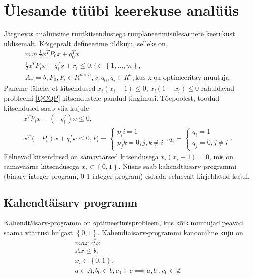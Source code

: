 \documentclass[a4paper]{article}
\numberwithin{equation}{section}
\theoremstyle{definition}
\begin{document}
\section{Ülesande t\"u\"ubi keerekuse anal\"u\"us}
Järgnevas anal\"u\"usime ruutkitsendustega ruuplaneerimis\"ulesannete keerukust \"uldisemalt. Kõigepealt defineerime \"uldkuju, selleks on,
\begin{equation}
\begin{gathered}
\label{QCQP}
min~ \frac{1}{2}x^T P_0 x + q_0^Tx  \\
\frac{1}{2}x^T P_i x + q_i^Tx + r_i \leq 0 , i \in \left\lbrace 1,...,m \right\rbrace, \\
Ax = b, P_0,P_i \in R^{n \times n}, x,q_0,q_i \in R^{n}, \text{kus x on optimeeritav muutuja.} 
\end{gathered}
\end{equation}
Paneme tähele, et kitsendused $x_i(x_i-1) \leq 0 $, $x_i(1-x_i) \leq 0 $ rahuldavad probleemi  \eqref{QCQP} kitsendustele pandud tingimusi. Tõepoolest, toodud kitsendused saab viia kujule
\begin{equation*}
\begin{gathered}
x^TP_i x + (-q_i^T) x \leq 0, \\
x^T(-P_i)x + q_i^Tx \leq 0, P_i =
\begin{cases}
p_ii = 1 \\ 
p_jk = 0, j,k \neq i
\end{cases}, 
q_i = \begin{cases}
q_i = 1 \\
q_j = 0, j \neq i
\end{cases}.
\end{gathered}
\end{equation*}
Eelnevad kitsendused on samaväärsed kitsendusega $x_i(x_i-1) = 0$, mis on samaväärne kitsendusega $x_i \in \left\lbrace 0,1 \right\rbrace$. Niisiis saab kahendtäisarv-programmi (binary integer program, 0-1 integer program) esitada eelnevalt kirjeldatud kujul.

\subsection{Kahendtäisarv programm}
 Kahendtäisarv-programm on optimeerimisprobleem, kus kõik muutujad peavad saama väärtusi hulgast $\left\lbrace 0,1 \right\rbrace$. Kahendtäisarv-programmi kanooniline kuju on 
\begin{equation}
\begin{gathered}
\label{binary}
max~ c^T x \\
Ax \leq b, \\
x_i \in  \left\lbrace 0,1 \right\rbrace, \\
a \in A, b_0 \in  b, c_0 \in c \implies a,b_0,c_0 \in \mathbb{Z} 
\end{gathered}
\end{equation}
\end{document}
